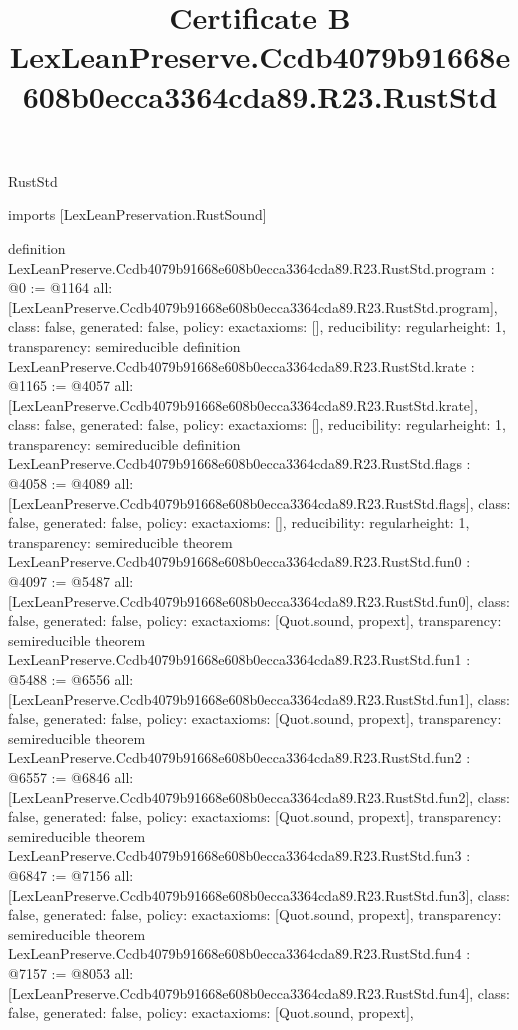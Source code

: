 \begin{lexlean}{RustStd}
\title{Certificate B LexLeanPreserve.Ccdb4079b91668e608b0ecca3364cda89.R23.RustStd}
\begin{coremodule}
imports [LexLeanPreservation.RustSound]

definition LexLeanPreserve.Ccdb4079b91668e608b0ecca3364cda89.R23.RustStd.program : @0 := @1164 {
  all: [LexLeanPreserve.Ccdb4079b91668e608b0ecca3364cda89.R23.RustStd.program],
  class: false,
  generated: false,
  policy: exact{axioms: []},
  reducibility: regular{height: 1},
  transparency: semireducible
}
definition LexLeanPreserve.Ccdb4079b91668e608b0ecca3364cda89.R23.RustStd.krate : @1165 := @4057 {
  all: [LexLeanPreserve.Ccdb4079b91668e608b0ecca3364cda89.R23.RustStd.krate],
  class: false,
  generated: false,
  policy: exact{axioms: []},
  reducibility: regular{height: 1},
  transparency: semireducible
}
definition LexLeanPreserve.Ccdb4079b91668e608b0ecca3364cda89.R23.RustStd.flags : @4058 := @4089 {
  all: [LexLeanPreserve.Ccdb4079b91668e608b0ecca3364cda89.R23.RustStd.flags],
  class: false,
  generated: false,
  policy: exact{axioms: []},
  reducibility: regular{height: 1},
  transparency: semireducible
}
theorem LexLeanPreserve.Ccdb4079b91668e608b0ecca3364cda89.R23.RustStd.fun0 : @4097 := @5487 {
  all: [LexLeanPreserve.Ccdb4079b91668e608b0ecca3364cda89.R23.RustStd.fun0],
  class: false,
  generated: false,
  policy: exact{axioms: [Quot.sound, propext]},
  transparency: semireducible
}
theorem LexLeanPreserve.Ccdb4079b91668e608b0ecca3364cda89.R23.RustStd.fun1 : @5488 := @6556 {
  all: [LexLeanPreserve.Ccdb4079b91668e608b0ecca3364cda89.R23.RustStd.fun1],
  class: false,
  generated: false,
  policy: exact{axioms: [Quot.sound, propext]},
  transparency: semireducible
}
theorem LexLeanPreserve.Ccdb4079b91668e608b0ecca3364cda89.R23.RustStd.fun2 : @6557 := @6846 {
  all: [LexLeanPreserve.Ccdb4079b91668e608b0ecca3364cda89.R23.RustStd.fun2],
  class: false,
  generated: false,
  policy: exact{axioms: [Quot.sound, propext]},
  transparency: semireducible
}
theorem LexLeanPreserve.Ccdb4079b91668e608b0ecca3364cda89.R23.RustStd.fun3 : @6847 := @7156 {
  all: [LexLeanPreserve.Ccdb4079b91668e608b0ecca3364cda89.R23.RustStd.fun3],
  class: false,
  generated: false,
  policy: exact{axioms: [Quot.sound, propext]},
  transparency: semireducible
}
theorem LexLeanPreserve.Ccdb4079b91668e608b0ecca3364cda89.R23.RustStd.fun4 : @7157 := @8053 {
  all: [LexLeanPreserve.Ccdb4079b91668e608b0ecca3364cda89.R23.RustStd.fun4],
  class: false,
  generated: false,
  policy: exact{axioms: [Quot.sound, propext]},
}
\end{coremodule}
\end{lexlean}
